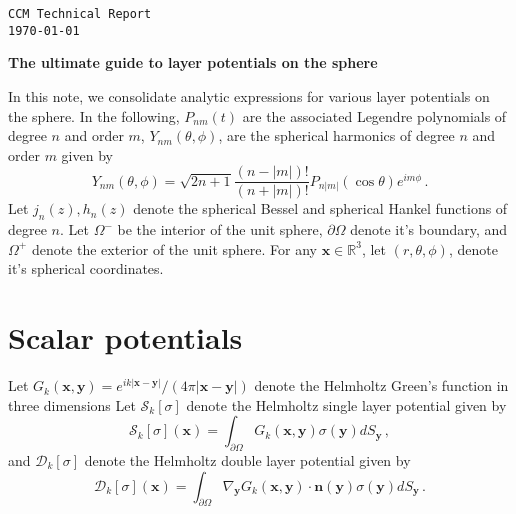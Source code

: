 \documentclass[11pt]{article}
\newcommand\bn{\boldsymbol n}
\newcommand\bx{\boldsymbol x}
\newcommand\by{\boldsymbol y}
\newcommand\cS{\mathcal{S}}
\newcommand\cD{\mathcal{D}}
\newcommand\bbR{\mathbb R}
\newcommand\pa{\partial}
\theoremstyle{definition}
\theoremstyle{remark}
\numberwithin{equation}{section}
\begin{document}



\begin{titlepage}

  \raggedleft
  {\texttt{CCM Technical Report\\
    \today}}
  
  \hrulefill

  \vspace{4\baselineskip}

  \raggedright
  {\LARGE \sffamily\bfseries The ultimate guide to layer potentials on the sphere}
  
  \vspace{\baselineskip}

  
  \vspace{3\baselineskip}
 \vspace{\baselineskip}
 
 \vspace{\baselineskip}
 
 
  
\end{titlepage}
\newpage
In this note, we consolidate analytic expressions for various layer potentials on the sphere. 
In the following, $P_{nm}(t)$ are the associated Legendre polynomials of degree $n$ and order $m$, $Y_{nm}(\theta,\phi)$, are the spherical harmonics of degree $n$ and order $m$ given by
\begin{equation}
Y_{nm}(\theta,\phi) = \sqrt{2n+1} \frac{(n-|m|)!}{(n+|m|)!}  P_{n|m|}(\cos{\theta}) e^{im\phi} \, .
\end{equation}  
Let $j_{n}(z),h_{n}(z)$ denote the spherical Bessel and spherical Hankel functions of degree $n$. Let $\Omega^{-}$ be the interior of the unit sphere, $\pa \Omega$ denote it's boundary, and $\Omega^{+}$ denote the exterior of the unit sphere. For any $\bx \in \bbR^3$, let $(r,\theta,\phi)$, denote it's spherical coordinates.

\section*{Scalar potentials}
Let $G_{k}(\bx,\by) = e^{ik|\bx-\by|}/(4 \pi |\bx - \by|)$ denote the Helmholtz Green's function in three dimensions
Let $\cS_{k}[\sigma]$ denote the Helmholtz single layer potential given by
\begin{equation}
\cS_{k}[\sigma](\bx) = \int_{\pa \Omega} G_{k}(\bx,\by) \sigma(\by) dS_{\by} \, ,
\end{equation}
and $\cD_{k}[\sigma]$ denote the Helmholtz double layer potential given by
\begin{equation}
\cD_{k}[\sigma](\bx) = \int_{\pa \Omega} \nabla_{\by} G_{k}(\bx,\by)  \cdot \bn(\by) \sigma(\by) dS_{\by} \, .
\end{equation}
\end{document}
